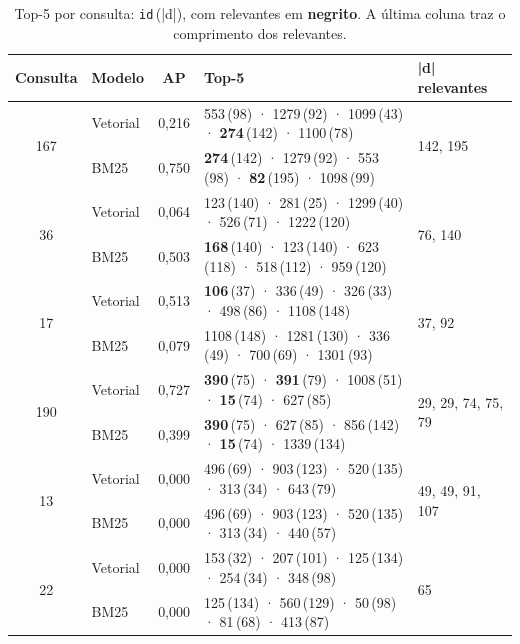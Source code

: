 \documentclass[10pt,a4paper]{article}
\newcommand{\R}[1]{\textbf{#1}}           %
\begin{document}
\begin{table}[h]
\centering\footnotesize
\setlength{\tabcolsep}{4pt}
\caption{Top-5 por consulta: \texttt{id}\,(|d|), com relevantes em \textbf{negrito}. A última
coluna traz o comprimento dos relevantes.}
\label{tab:top5}
\begin{tabular}{clcll}
\toprule
Consulta & Modelo & AP & Top-5 & |d| relevantes \\
\midrule
\multirow{2}{*}{167} & Vetorial & 0,216 & 553\,(98) · 1279\,(92) · 1099\,(43) · \R{274}\,(142) · 1100\,(78) & \multirow{2}{*}{142, 195} \\
                     & BM25     & 0,750 & \R{274}\,(142) · 1279\,(92) · 553\,(98) · \R{82}\,(195) · 1098\,(99) & \\
\midrule
\multirow{2}{*}{36}  & Vetorial & 0,064 & 123\,(140) · 281\,(25) · 1299\,(40) · 526\,(71) · 1222\,(120) & \multirow{2}{*}{76, 140} \\
                     & BM25     & 0,503 & \R{168}\,(140) · 123\,(140) · 623\,(118) · 518\,(112) · 959\,(120) & \\
\midrule
\multirow{2}{*}{17}  & Vetorial & 0,513 & \R{106}\,(37) · 336\,(49) · 326\,(33) · 498\,(86) · 1108\,(148) & \multirow{2}{*}{37, 92} \\
                     & BM25     & 0,079 & 1108\,(148) · 1281\,(130) · 336\,(49) · 700\,(69) · 1301\,(93) & \\
\midrule
\multirow{2}{*}{190} & Vetorial & 0,727 & \R{390}\,(75) · \R{391}\,(79) · 1008\,(51) · \R{15}\,(74) · 627\,(85) & \multirow{2}{*}{29, 29, 74, 75, 79} \\
                     & BM25     & 0,399 & \R{390}\,(75) · 627\,(85) · 856\,(142) · \R{15}\,(74) · 1339\,(134) & \\
\midrule
\multirow{2}{*}{13}  & Vetorial & 0,000 & 496\,(69) · 903\,(123) · 520\,(135) · 313\,(34) · 643\,(79) & \multirow{2}{*}{49, 49, 91, 107} \\
                     & BM25     & 0,000 & 496\,(69) · 903\,(123) · 520\,(135) · 313\,(34) · 440\,(57) & \\
\midrule
\multirow{2}{*}{22}  & Vetorial & 0,000 & 153\,(32) · 207\,(101) · 125\,(134) · 254\,(34) · 348\,(98) & \multirow{2}{*}{65} \\
                     & BM25     & 0,000 & 125\,(134) · 560\,(129) · 50\,(98) · 81\,(68) · 413\,(87) & \\
\bottomrule
\end{tabular}
\end{table}
\end{document}
